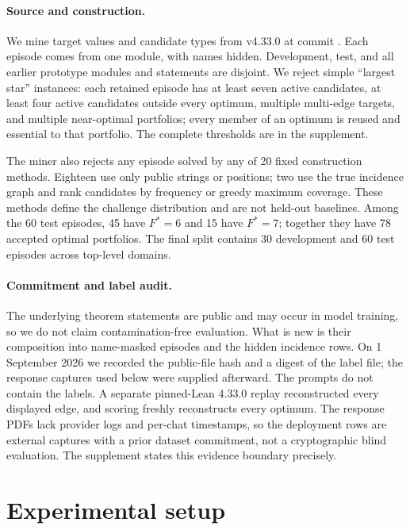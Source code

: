 \paragraph{Source and construction.}
We mine target values and candidate types from \mathlib{} v4.33.0 at commit
\citep{mathlib2020,mathlib433commit}.  Each episode comes from one module, with
names hidden.  Development, test, and all earlier prototype modules and
statements are disjoint.  We reject simple ``largest star'' instances: each
retained episode has at least seven active candidates, at least four active
candidates outside every optimum, multiple multi-edge targets, and multiple
near-optimal portfolios; every member of an optimum is reused and essential to
that portfolio.  The complete thresholds are in the supplement.

The miner also rejects any episode solved by any of 20 fixed construction
methods.  Eighteen use only public strings or positions; two use the true
incidence graph and rank candidates by frequency or greedy maximum coverage.
These methods define the challenge distribution and are not held-out baselines.
Among the 60 test episodes, 45 have $F^*=6$ and 15 have $F^*=7$; together they
have 78 accepted optimal portfolios.  The final split contains 30 development
and 60 test episodes across \BlindDomainCount{} top-level domains.

\paragraph{Commitment and label audit.}
The underlying theorem statements are public and may occur in model training,
so we do not claim contamination-free evaluation.  What is new is their
composition into name-masked episodes and the hidden incidence rows.  On 1
September 2026 we recorded the public-file hash and a digest of the label file;
the response captures used below were supplied afterward.  The prompts do not
contain the labels.  A separate pinned-Lean 4.33.0 replay reconstructed every
displayed edge, and scoring freshly reconstructs every optimum.  The response
PDFs lack provider logs and per-chat timestamps, so the deployment rows are
external captures with a prior dataset commitment, not a cryptographic blind
evaluation.  The supplement states this evidence boundary precisely.

\section{Experimental setup}

